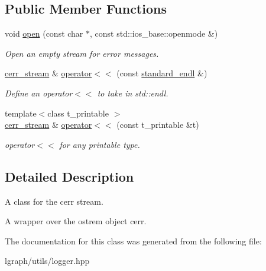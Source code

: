 \subsection*{Public Member Functions}
\begin{DoxyCompactItemize}
\item 
\mbox{\label{classlgraph_1_1utils_1_1cerr__stream_aaec9df1b58756fcda596e29bbfcefeac}} 
void \hyperlink{classlgraph_1_1utils_1_1cerr__stream_aaec9df1b58756fcda596e29bbfcefeac}{open} (const char $\ast$, const std\+::ios\+\_\+base\+::openmode \&)
\begin{DoxyCompactList}\small\item\em Open an empty stream for error messages. \end{DoxyCompactList}\item 
\mbox{\label{classlgraph_1_1utils_1_1cerr__stream_afd3014b9b67c23c7c86513c0f4969723}} 
\hyperlink{classlgraph_1_1utils_1_1cerr__stream}{cerr\+\_\+stream} \& \hyperlink{classlgraph_1_1utils_1_1cerr__stream_afd3014b9b67c23c7c86513c0f4969723}{operator$<$$<$} (const \hyperlink{classlgraph_1_1utils_1_1cerr__stream_a8b7e7603a4e656bd2d9196ae0f530c7b}{standard\+\_\+endl} \&)
\begin{DoxyCompactList}\small\item\em Define an operator$<$$<$ to take in std\+::endl. \end{DoxyCompactList}\item 
\mbox{\label{classlgraph_1_1utils_1_1cerr__stream_afd9313105917714104d41bb3990ab81c}} 
{\footnotesize template$<$class t\+\_\+printable $>$ }\\\hyperlink{classlgraph_1_1utils_1_1cerr__stream}{cerr\+\_\+stream} \& \hyperlink{classlgraph_1_1utils_1_1cerr__stream_afd9313105917714104d41bb3990ab81c}{operator$<$$<$} (const t\+\_\+printable \&t)
\begin{DoxyCompactList}\small\item\em operator$<$$<$ for any printable type. \end{DoxyCompactList}\end{DoxyCompactItemize}


\subsection{Detailed Description}
A class for the cerr stream. 

A wrapper over the ostrem object cerr. 

The documentation for this class was generated from the following file\+:\begin{DoxyCompactItemize}
\item 
lgraph/utils/logger.\+hpp\end{DoxyCompactItemize}
